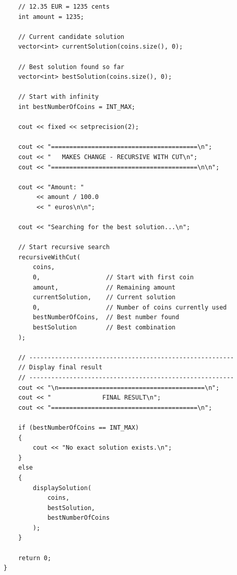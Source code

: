 \documentclass[11pt,a4paper]{article}
\begin{document}
\begin{lstlisting}
    // 12.35 EUR = 1235 cents
    int amount = 1235;

    // Current candidate solution
    vector<int> currentSolution(coins.size(), 0);

    // Best solution found so far
    vector<int> bestSolution(coins.size(), 0);

    // Start with infinity
    int bestNumberOfCoins = INT_MAX;

    cout << fixed << setprecision(2);

    cout << "========================================\n";
    cout << "   MAKES CHANGE - RECURSIVE WITH CUT\n";
    cout << "========================================\n\n";

    cout << "Amount: "
         << amount / 100.0
         << " euros\n\n";

    cout << "Searching for the best solution...\n";

    // Start recursive search
    recursiveWithCut(
        coins,
        0,                  // Start with first coin
        amount,             // Remaining amount
        currentSolution,    // Current solution
        0,                  // Number of coins currently used
        bestNumberOfCoins,  // Best number found
        bestSolution        // Best combination
    );

    // --------------------------------------------------------
    // Display final result
    // --------------------------------------------------------
    cout << "\n========================================\n";
    cout << "              FINAL RESULT\n";
    cout << "========================================\n";

    if (bestNumberOfCoins == INT_MAX)
    {
        cout << "No exact solution exists.\n";
    }
    else
    {
        displaySolution(
            coins,
            bestSolution,
            bestNumberOfCoins
        );
    }

    return 0;
}
\end{lstlisting}
\end{document}

